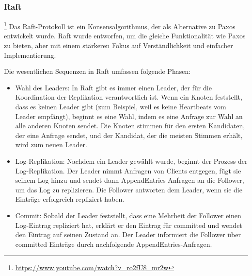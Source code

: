 \subsubsection{Raft}\footnote{\url{https://www.youtube.com/watch?v=ro2fU8_mr2w}}
Das Raft-Protokoll ist ein Konsensalgorithmus, der als Alternative zu Paxos entwickelt wurde. Raft wurde entworfen, um die gleiche Funktionalität wie Paxos zu bieten, aber mit einem stärkeren Fokus auf Verständlichkeit und einfacher Implementierung.

Die wesentlichen Sequenzen in Raft umfassen folgende Phasen:
\begin{itemize}
\item Wahl des Leaders: In Raft gibt es immer einen Leader, der für die Koordination der Replikation verantwortlich ist. Wenn ein Knoten feststellt, dass es keinen Leader gibt (zum Beispiel, weil es keine Heartbeats vom Leader empfängt), beginnt es eine Wahl, indem es eine Anfrage zur Wahl an alle anderen Knoten sendet. Die Knoten stimmen für den ersten Kandidaten, der eine Anfrage sendet, und der Kandidat, der die meisten Stimmen erhält, wird zum neuen Leader.
\item Log-Replikation: Nachdem ein Leader gewählt wurde, beginnt der Prozess der Log-Replikation. Der Leader nimmt Anfragen von Clients entgegen, fügt sie seinem Log hinzu und sendet dann AppendEntries-Anfragen an die Follower, um das Log zu replizieren. Die Follower antworten dem Leader, wenn sie die Einträge erfolgreich repliziert haben.
\item Commit: Sobald der Leader feststellt, dass eine Mehrheit der Follower einen Log-Eintrag repliziert hat, erklärt er den Eintrag für committed und wendet den Eintrag auf seinen Zustand an. Der Leader informiert die Follower über committed Einträge durch nachfolgende AppendEntries-Anfragen.
\end{itemize}


